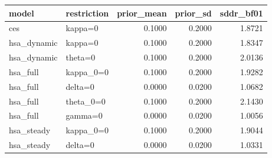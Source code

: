 \begin{tabular}{llrrr}
\toprule
model & restriction & prior\_mean & prior\_sd & sddr\_bf01 \\
\midrule
ces & kappa=0 & 0.1000 & 0.2000 & 1.8721 \\
hsa\_dynamic & kappa=0 & 0.1000 & 0.2000 & 1.8347 \\
hsa\_dynamic & theta=0 & 0.1000 & 0.2000 & 2.0136 \\
hsa\_full & kappa\_0=0 & 0.1000 & 0.2000 & 1.9282 \\
hsa\_full & delta=0 & 0.0000 & 0.0200 & 1.0682 \\
hsa\_full & theta\_0=0 & 0.1000 & 0.2000 & 2.1430 \\
hsa\_full & gamma=0 & 0.0000 & 0.0200 & 1.0056 \\
hsa\_steady & kappa\_0=0 & 0.1000 & 0.2000 & 1.9044 \\
hsa\_steady & delta=0 & 0.0000 & 0.0200 & 1.0331 \\
\bottomrule
\end{tabular}

